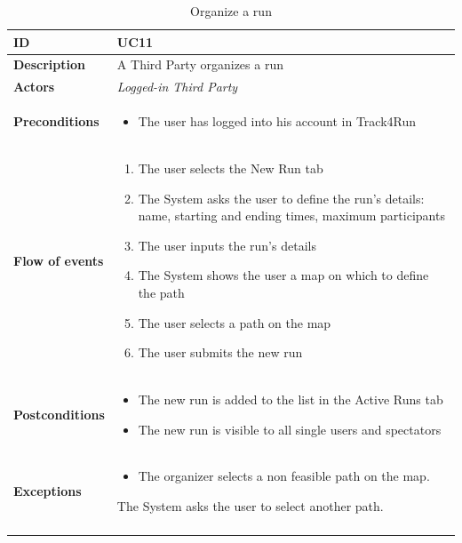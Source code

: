\documentclass[titlepage]{article}
\begin{document}
\begin{longtable}{| p{3 cm} | p{10 cm} |} 
			\hline
			{\bf ID} & UC11 \\
			\hline
			{\bf Description} & A Third Party organizes a run  \\
			\hline
			{\bf Actors} & {\it Logged-in Third Party }\\
			\hline
			{\bf Preconditions} & 		
							\begin{itemize}
								\item The user has logged into his account in Track4Run
							\end{itemize}
			\\
			\hline
			{\bf Flow of events} & 
							\begin{enumerate}
								\item The user selects the New Run tab
\item The System asks the user to define the run’s details: name, starting and ending times, maximum participants
\item The user inputs the run’s details
\item The System shows the user a map on which to define the path
\item The user selects a path on the map
\item The user submits the new run
							\end{enumerate}
			
			 \\
			\hline
			{\bf Postconditions} & 
							\begin{itemize}
								\item The new run is added to the list in the Active Runs tab
\item The new run is visible to all single users and spectators

							\end{itemize}
			\\
			\hline
			{\bf Exceptions} & 
							\begin{itemize}
								\item The organizer selects a non feasible path on the map.
							\end{itemize}
							The System asks the user to select another path.						
			\\
			\hline
			\caption{Organize a run}
			\end{longtable}
\end{document}
